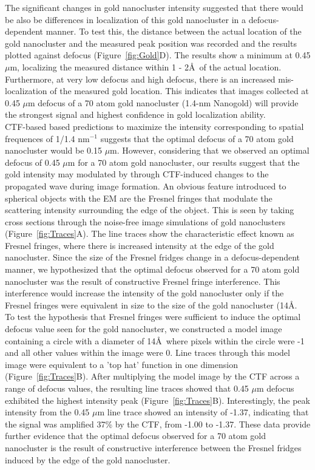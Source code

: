  \indent The significant changes in gold nanocluster intensity suggested that there would be also be differences in localization of this gold nanocluster in a defocus-dependent manner. To test this, the distance between the actual location of the gold nanocluster and the measured peak position was recorded and the results plotted against defocus (Figure~\ref{fig:Gold}D). The results show a minimum at 0.45 $\mu$m, localizing the measured distance within 1 - 2\AA\ of the actual location. Furthermore, at very low defocus and high defocus, there is an increased mis-localization of the measured gold location. This indicates that images collected at 0.45 $\mu$m defocus of a 70 atom gold nanocluster (1.4-nm Nanogold) will provide the strongest signal and highest confidence in gold localization ability.\\
 \indent CTF-based based predictions to maximize the intensity corresponding to spatial frequences of 1/1.4 nm$^{-1}$ suggests that the optimal defocus of a 70 atom gold nanocluster would be 0.15 $\mu$m. However, considering that we observed an optimal defocus of 0.45 $\mu$m for a 70 atom gold nanocluster, our results suggest that the gold intensity may modulated by through CTF-induced changes to the propagated wave during image formation. An obvious feature introduced to spherical objects with the EM are the Fresnel fringes that modulate the scattering intensity surrounding the edge of the object. This is seen by taking cross sections through the noise-free image simulations of gold nanoclusters (Figure~\ref{fig:Traces}A). The line traces show the characteristic effect known as Fresnel fringes, where there is increased intensity at the edge of the gold nanocluster. Since the size of the Fresnel fridges change in a defocus-dependent manner, we hypothesized that the optimal defocus observed for a 70 atom gold nanocluster was the result of constructive Fresnel fringe interference. This interference would increase the intensity of the gold nanocluster only if the Fresnel fringes were equivalent in size to the size of the gold nanocluster (14\AA\). \\
 \indent To test the hypothesis that Fresnel fringes were sufficient to induce the optimal defocus value seen for the gold nanocluster, we constructed a model image containing a circle with a diameter of 14\AA\, where pixels within the circle were -1 and all other values within the image were 0. Line traces through this model image were equivalent to a 'top hat' function in one dimension (Figure~\ref{fig:Traces}B). After multiplying the model image by the CTF across a range of defocus values, the resulting line traces showed that 0.45 $\mu$m defocus exhibited the highest intensity peak (Figure~\ref{fig:Traces}B). Interestingly, the peak intensity from the 0.45 $\mu$m line trace showed an intensity of -1.37, indicating that the signal was amplified 37\% by the CTF, from -1.00 to -1.37. These data provide further evidence that the optimal defocus observed for a 70 atom gold nanocluster is the result of constructive interference between the Fresnel fridges induced by the edge of the gold nanocluster.\\
